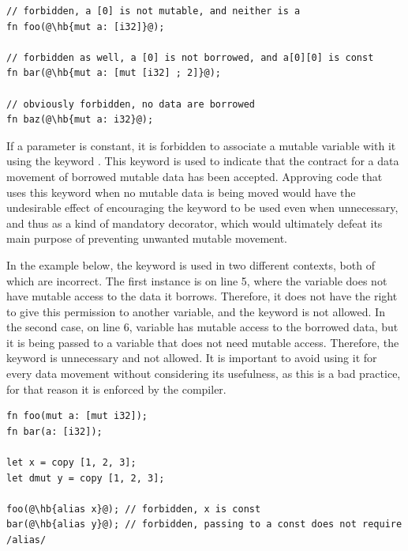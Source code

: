 \begin{lstlisting}[style=coloredverbatimError, escapechar=@]
// forbidden, a [0] is not mutable, and neither is a
fn foo(@\hb{mut a: [i32]}@);

// forbidden as well, a [0] is not borrowed, and a[0][0] is const
fn bar(@\hb{mut a: [mut [i32] ; 2]}@);

// obviously forbidden, no data are borrowed
fn baz(@\hb{mut a: i32}@);
\end{lstlisting}

If a parameter is constant, it is forbidden to associate a mutable variable with
it using the keyword . This keyword is used to indicate that the
contract for a data movement of borrowed mutable data has been accepted.
Approving code that uses this keyword when no mutable data is being moved would
have the undesirable effect of encouraging the keyword to be used even when
unnecessary, and thus as a kind of mandatory decorator, which would ultimately
defeat its main purpose of preventing unwanted mutable movement.

In the example below, the keyword  is used in two different
contexts, both of which are incorrect. The first instance is on line 5, where
the variable  does not have mutable access to the data it borrows.
Therefore, it does not have the right to give this permission to another
variable, and the keyword  is not allowed. In the second case, on
line 6, variable  has mutable access to the borrowed data, but it is
being passed to a variable that does not need mutable access. Therefore, the
keyword is unnecessary and not allowed. It is important to avoid using it for
every data movement without considering its usefulness, as this is a bad
practice, for that reason it is enforced by the compiler.

\begin{lstlisting}[style=coloredverbatimError, escapechar=@]
fn foo(mut a: [mut i32]);
fn bar(a: [i32]);

let x = copy [1, 2, 3];
let dmut y = copy [1, 2, 3];

foo(@\hb{alias x}@); // forbidden, x is const
bar(@\hb{alias y}@); // forbidden, passing to a const does not require /alias/
\end{lstlisting}

\vfill%
\pagebreak
